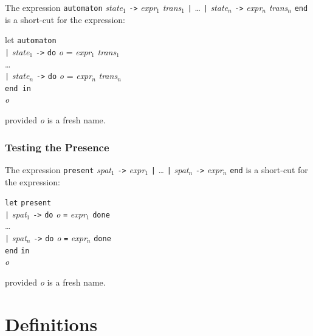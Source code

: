 \documentclass[11pt,titlepage,twoside]{report}
\newcommand{\In}{\mbox{{\tt in}}}
\newcommand{\Minusgreater}{\mbox{{\tt ->}}}
\newcommand{\term}[1]{{\tt #1}}
\newcommand{\nterm}[1]{{\em #1}}
\begin{document}
The expression 
\term{automaton} \nterm{state}$_1$ \term{\Minusgreater} \nterm{expr}$_1$ 
                 \nterm{trans}$_1$ 
\term{|} \dots
\term{|} \nterm{state}$_n$ \term{\Minusgreater} \nterm{expr}$_n$ 
                 \nterm{trans}$_n$ \term{end} is a short-cut
for the expression:

\begin{tabbing}
let \= \term{automaton} \\
    \> \term{|} \nterm{state}$_1$ \term{\Minusgreater} 
                 \term{do} \nterm{o} = \nterm{expr}$_1$ \nterm{trans}$_1$ \\
    \> \dots \\
    \> \term{|} \nterm{state}$_n$ \term{\Minusgreater} 
              \term{do} \nterm{o} = \nterm{expr}$_n$ \nterm{trans}$_n$ \\
    \> \term{end in} \\
\nterm{o}
\end{tabbing}
provided \nterm{o} is a fresh name.

\subsubsection{Testing the Presence} %

The expression
\term{present}
  \nterm{spat}$_1$ \term{\Minusgreater} \nterm{expr}$_1$ \term{|} \dots 
\term{|} \nterm{spat}$_n$ \term{\Minusgreater} \nterm{expr}$_n$ \term{end}
is a short-cut for the expression:

\begin{center}
\begin{tabbing}
\term{let} \= \term{present} \\
           \> \term{|} \nterm{spat}$_1$ \term{\Minusgreater} 
               \term{do} \nterm{o} \term{=} \nterm{expr}$_1$ \term{done} \\
           \> \dots \\
           \> \term{|} \nterm{spat}$_n$ \term{\Minusgreater} 
               \term{do} \nterm{o} \term{=} \nterm{expr}$_n$ \term{done} \\
           \> \term{end} \In \\
\nterm{o}
\end{tabbing}
\end{center}
provided \nterm{o} is a fresh name.

\section{Definitions\label{langdefs}} %
\end{document}
